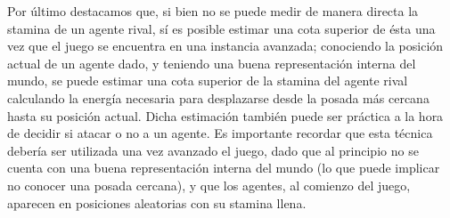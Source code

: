\documentclass[a4paper,10pt,spanish]{article}
\begin{document}
	Por \'ultimo destacamos que, si bien no se puede medir de manera directa la stamina de un agente rival, s\'i es posible estimar una cota superior	de \'esta una vez que el juego se encuentra en una instancia avanzada; conociendo la posici\'on actual de un agente dado, y teniendo una buena representaci\'on interna del mundo, se puede estimar una cota superior de la stamina del agente rival calculando la energ\'ia necesaria para desplazarse desde la posada m\'as cercana hasta su posici\'on actual. Dicha estimaci\'on tambi\'en puede ser pr\'actica a la hora de decidir si atacar o no a un agente. Es importante recordar que esta t\'ecnica deber\'ia ser utilizada una vez avanzado el juego, dado que al principio no se cuenta con una buena representaci\'on interna del mundo (lo que puede implicar no conocer una posada cercana), y que los agentes, al comienzo del juego, aparecen en posiciones aleatorias con su stamina llena.
	
% 	
	
\end{document}
